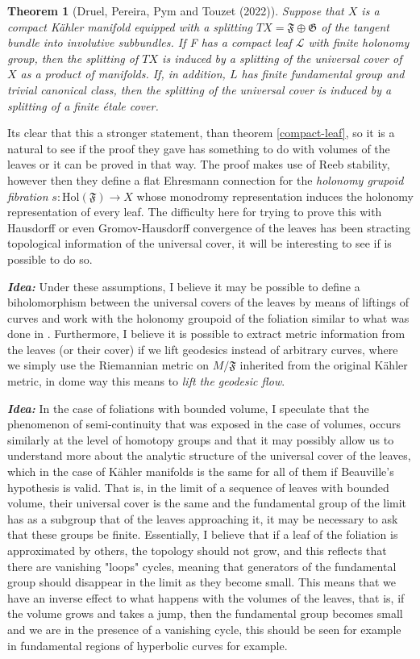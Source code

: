 \documentclass[12pt,twoside,a4paper]{report}
\newtheorem{theorem}{Theorem}[section]
\begin{document}
\begin{theorem}[Druel, Pereira, Pym and Touzet (2022)]\label{DPPT}
Suppose that $X$ is a compact Kähler manifold equipped with a splitting $TX=\mathfrak{F}\oplus\mathfrak{G}$ of the tangent bundle into involutive subbundles. If F has a compact leaf $\mathcal{L}$ with finite holonomy group, then the splitting of $TX$ is induced by a splitting of the universal cover of $X$ as a product of manifolds. If, in addition,
$L$ has finite fundamental group and trivial canonical class, then the splitting of the universal cover is induced by a splitting of a finite étale cover. 
\end{theorem}

Its clear that this a stronger statement, than theorem \ref{compact-leaf}, so it is a natural to see if the proof they gave has something to do with volumes of the leaves or it can be proved in that way. The proof makes use of Reeb stability, however then they define a flat Ehresmann connection for the \emph{holonomy grupoid fibration} $s:\mathrm{Hol}(\mathfrak{F})\to X$ whose monodromy representation induces the holonomy representation of every leaf. The difficulty here for trying to prove this with Hausdorff or even Gromov-Hausdorff convergence of the leaves has been stracting topological information of the universal cover, it will be interesting to see if is possible to do so.

\noindent\emph{\bf Idea:} Under these assumptions, I believe it may be possible to define a biholomorphism between the universal covers of the leaves by means of liftings of curves and work with the holonomy groupoid of the foliation similar to what was done in \cite{DPPT}. Furthermore, I believe it is possible to extract metric information from the leaves (or their cover) if we lift geodesics instead of arbitrary curves, where we simply use the Riemannian metric on $M/\mathfrak{F}$ inherited from the original Kähler metric, in dome way this means to \emph{lift the geodesic flow}.

\noindent\emph{\bf Idea:} In the case of foliations with bounded volume, I speculate that the phenomenon of semi-continuity that was exposed in the case of volumes, occurs similarly at the level of homotopy groups and that it may possibly allow us to understand more about the analytic structure of the universal cover of the leaves, which in the case of Kähler manifolds is the same for all of them if Beauville's hypothesis is valid. That is, in the limit of a sequence of leaves with bounded volume, their universal cover is the same and the fundamental group of the limit has as a subgroup that of the leaves approaching it, it may be necessary to ask that these groups be finite. Essentially, I believe that if a leaf of the foliation is approximated by others, the topology should not grow, and this reflects that there are vanishing "loops" cycles, meaning that generators of the fundamental group should disappear in the limit as they become small. This means that we have an inverse effect to what happens with the volumes of the leaves, that is, if the volume grows and takes a jump, then the fundamental group becomes small and we are in the presence of a vanishing cycle, this should be seen for example in fundamental regions of hyperbolic curves for example.
\end{document}

